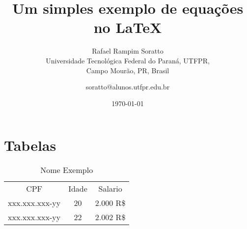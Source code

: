 \documentclass{article}
\title{Um simples exemplo de equações no \LaTeX}
\author{Rafael Rampim Soratto  \\
	Universidade Tecnológica Federal do Paraná, UTFPR,\\ Campo Mourão, PR, Brasil \\
	\and 
	\small{soratto@alunos.utfpr.edu.br}
}
\date{\today}
\begin{document}
    \section{Tabelas}

\begin{table}[H]
\caption{Nome Exemplo} 
\label{tab:exemplo} 
\begin{center}
\begin{tabular}{|c|c|c|} 
\hline
CPF & Idade & Salario  \\
xxx.xxx.xxx-yy & 20 & 2.000 R\$ \\ \hline
xxx.xxx.xxx-yy & 22 & 2.002 R\$ \\ 
\hline
\end{tabular} 
\end{center}
\end{table}
\end{document}
